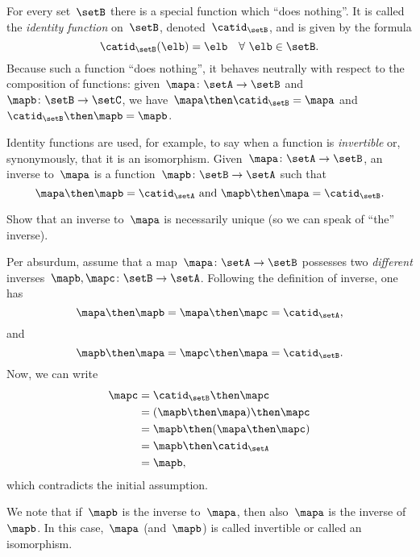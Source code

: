 For every set~$\setB$ there is a special function which ``does nothing''.
It is called the \emph{identity function} on~$\setB$, denoted~$\catid_\setB$, and is given by the formula
\begin{equation*}
    \catid_\setB(\elb) = \elb \quad \forall \ \elb \in \setB.
\end{equation*}
Because such a function ``does nothing'', it behaves neutrally with respect to the composition of functions: given~$\mapa \colon \setA \to \setB$ and~$\mapb \colon \setB \to \setC$, we have~$\mapa \then \catid_\setB = \mapa$ and~$\catid_\setB \then \mapb = \mapb$.

Identity functions are used, for example, to say when a function is \emph{invertible} or, synonymously, that it is an isomorphism.
Given~$\mapa \colon \setA \to \setB$, an inverse to~$\mapa$ is a function~$\mapb \colon \setB \to \setA$ such that
\begin{equation}
    \label{eq:isomorphism-equations}
    \mapa \then \mapb = \catid_\setA \text{ and }  \mapb \then \mapa = \catid_\setB.
\end{equation}
%

\begin{exercise}
    Show that an inverse to~$\mapa$ is necessarily unique (so we can speak of ``the'' inverse).
\end{exercise}
\begin{solution}
    Per absurdum, assume that a map~$\mapa\colon \setA \to \setB$ possesses two \emph{different} inverses~$\mapb,\mapc\colon \setB\to \setA$.
    Following the definition of inverse, one has
    \begin{equation*}
        \mapa \then \mapb=\mapa \then \mapc=\catid_\setA,
    \end{equation*}
    and
    \begin{equation*}
        \mapb \then \mapa=\mapc \then \mapa=\catid_\setB.
    \end{equation*}
    Now, we can write
    \begin{equation*}
    \begin{aligned}
        \mapc&=\catid_\setB \then \mapc\\
        &=(\mapb \then \mapa)\then \mapc\\
        &=\mapb\then (\mapa \then \mapc)\\
        &=\mapb \then \catid_\setA \\
        &=\mapb,
    \end{aligned}
    \end{equation*}
    which contradicts the initial assumption.
\end{solution}
We note that if~$\mapb$ is the inverse to~$\mapa$, then also~$\mapa$ is the inverse of~$\mapb$.
In this case,~$\mapa$ (and~$\mapb$) is called invertible or called an isomorphism.

